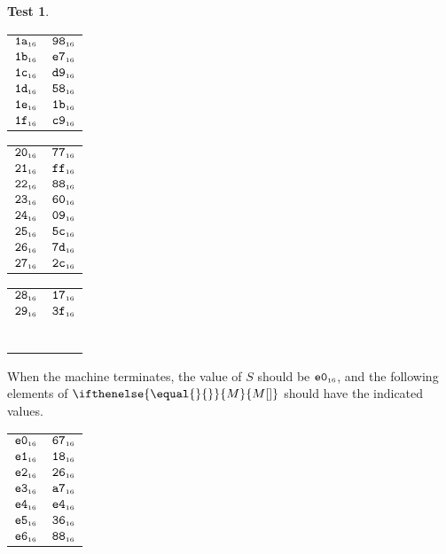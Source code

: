 \documentclass[a4paper,12pt]{article}
\makeatletter
\newcommand{\num}[1]{\texttt{\MakeLowercase{#1}}}
\newcommand{\hex}[1]{\num{#1}_{\textup{\tiny 16}}}
\newcommand{\MEM}[1]{\ifthenelse{\equal{#1}{}}{M}{M[#1]}}
\newcommand{\SP}{S}
\theoremstyle{definition}
\newtheorem{test}{Test}
\newenvironment{memtable}{%
  \begin{trivlist}
    \item
    }{%
    \end{trivlist}}
\newenvironment{memcolumn}{%
  \begin{tabular}{@{}ll@{}}
    \hline}
    {%
    \hline
  \end{tabular}}
\newcommand{\memspace}{\qquad}
\makeatother
\begin{document}
\begin{test}
\begin{memtable}
\begin{memcolumn}
      $\hex{1A}$ & $\hex{98}$ \\
      $\hex{1B}$ & $\hex{E7}$ \\
      $\hex{1C}$ & $\hex{D9}$ \\
      $\hex{1D}$ & $\hex{58}$ \\
      $\hex{1E}$ & $\hex{1B}$ \\
      $\hex{1F}$ & $\hex{C9}$ \\
    \end{memcolumn}
    \memspace
    \begin{memcolumn}
      $\hex{20}$ & $\hex{77}$ \\
      $\hex{21}$ & $\hex{FF}$ \\
      $\hex{22}$ & $\hex{88}$ \\
      $\hex{23}$ & $\hex{60}$ \\
      $\hex{24}$ & $\hex{09}$ \\
      $\hex{25}$ & $\hex{5C}$ \\
      $\hex{26}$ & $\hex{7D}$ \\
      $\hex{27}$ & $\hex{2C}$ \\
    \end{memcolumn}
    \memspace
    \begin{memcolumn}
      $\hex{28}$ & $\hex{17}$ \\
      $\hex{29}$ & $\hex{3F}$ \\
      \\
      \\
      \\
      \\
      \\
      \\
    \end{memcolumn}
  \end{memtable}
  When the machine terminates, the value of $\SP$ should be $\hex{E0}$, and the following elements of $\MEM{}$ should have the indicated values.
  \begin{memtable}
    \begin{memcolumn}
      $\hex{E0}$ & $\hex{67}$ \\
      $\hex{E1}$ & $\hex{18}$ \\
      $\hex{E2}$ & $\hex{26}$ \\
      $\hex{E3}$ & $\hex{A7}$ \\
      $\hex{E4}$ & $\hex{E4}$ \\
      $\hex{E5}$ & $\hex{36}$ \\
      $\hex{E6}$ & $\hex{88}$ \\

\end{memcolumn}
\end{memtable}
\end{test}
\end{document}
